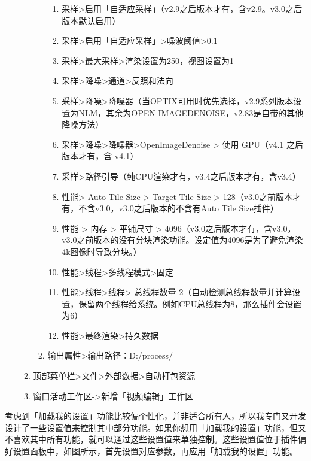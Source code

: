 \documentclass{../../public_resources/doc}
\begin{document}
\begin{enumerate}
\begin{enumerate}
\begin{enumerate}
\begin{enumerate}
                \item 采样>启用「自适应采样」（v2.9之后版本才有，含v2.9。v3.0之后版本默认启用）
                \item 采样>启用「自适应采样」>噪波阈值>0.1
                \item 采样>最大采样>渲染设置为250，视图设置为1
                \item 采样>降噪>通道>反照和法向
                \item 采样>降噪>降噪器（当OPTIX可用时优先选择，v2.9系列版本设置为NLM，其余为OPEN IMAGEDENOISE，v2.83是自带的其他降噪方法）
                \item 采样>降噪>降噪器>OpenImageDenoise > 使用 GPU（v4.1 之后版本才有，含 v4.1）
                \item 采样>路径引导（纯CPU渲染才有，v3.4之后版本才有，含v3.4）
                \item 性能> Auto Tile Size > Target Tile Size > 128（v3.0之前版本才有，不含v3.0，v3.0之后版本的不含有Auto Tile Size插件）
                \item 性能 > 内存  > 平铺尺寸 > 4096（v3.0之后版本才有，含v3.0，v3.0之前版本的没有分块渲染功能。设定值为4096是为了避免渲染4k图像时导致分块。）
                \item 性能>线程>多线程模式>固定
                \item 性能>线程>线程> 总线程数量-2（自动检测总线程数量并计算设置，保留两个线程给系统。例如CPU总线程为8，那么插件会设置为6）
                \item 性能>最终渲染>持久数据
            \end{enumerate}
            \item 输出属性>输出路径：D:/process/
        \end{enumerate}
        \item 顶部菜单栏>文件>外部数据>自动打包资源
        \item 窗口活动工作区->新增「视频编辑」工作区
    \end{enumerate}
\end{enumerate}

考虑到「加载我的设置」功能比较偏个性化，并非适合所有人，所以我专门又开发设计了一些设置值来控制其中部分功能。如果你想用「加载我的设置」功能，但又不喜欢其中所有功能，就可以通过这些设置值来单独控制。这些设置值位于插件偏好设置面板中，如图所示，首先设置对应参数，再应用「加载我的设置」功能。
\end{document}
